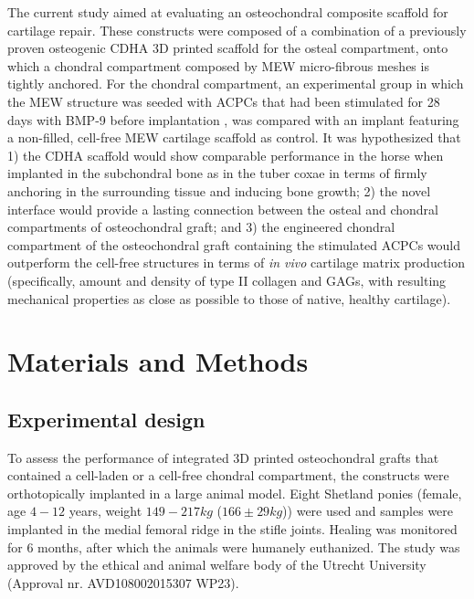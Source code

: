\documentclass[twocolumn, empirical, authordate, issue]{jote-new-article}
\begin{document}
The current study aimed at evaluating an osteochondral composite scaffold for cartilage repair. These constructs were composed of a combination of a previously proven osteogenic CDHA 3D printed scaffold for the osteal compartment, onto which a chondral compartment composed by MEW micro-fibrous meshes is tightly anchored. For the chondral compartment, an experimental group in which the MEW structure was seeded with ACPCs that had been stimulated for 28 days with BMP-9 before implantation \parencite{Abinzano2018}, was compared with an implant featuring a non-filled, cell-free MEW cartilage scaffold as control. It was hypothesized that 1) the CDHA scaffold would show comparable performance in the horse when implanted in the subchondral bone as in the tuber coxae in terms of firmly anchoring in the surrounding tissue and inducing bone growth; 2) the novel interface would provide a lasting connection between the osteal and chondral compartments of osteochondral graft; and 3) the engineered chondral compartment of the osteochondral graft containing the stimulated ACPCs would outperform the cell-free structures in terms of \emph{in vivo} cartilage matrix production (specifically, amount and density of type II collagen and GAGs, with resulting mechanical properties as close as possible to those of native, healthy cartilage).

\section{Materials and Methods} 

\subsection{Experimental design} 

To assess the performance of integrated 3D printed osteochondral grafts that contained a cell-laden or a cell-free chondral compartment, the constructs were orthotopically implanted in a large animal model. Eight Shetland ponies (female, age $4-12$ years, weight $149 - 217 kg$ ($166 \pm 29 kg$)) were used and samples were implanted in the medial femoral ridge in the stifle joints. Healing was monitored for 6 months, after which the animals were humanely euthanized. The study was approved by the ethical and animal welfare body of the Utrecht University (Approval nr. AVD108002015307 WP23).
\end{document}
